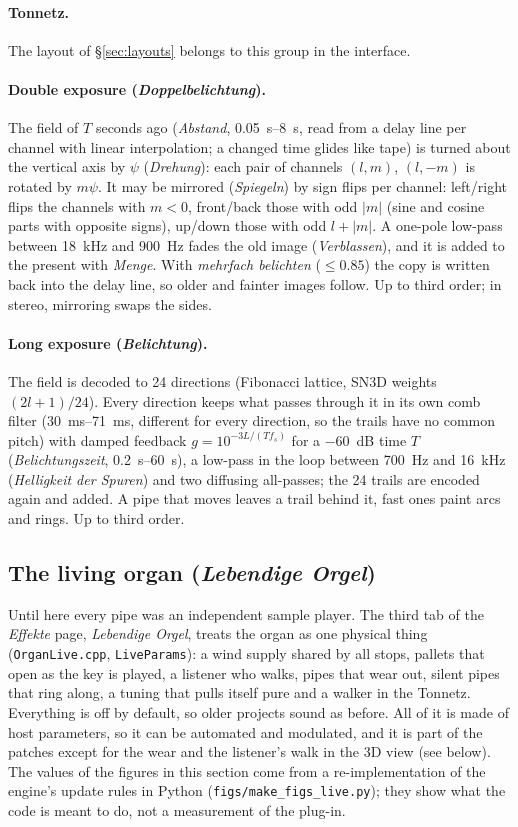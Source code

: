 \documentclass[11pt,a4paper,parskip=half,DIV=11,toc=bibliography]{scrartcl}
\newcommand{\ui}[1]{\emph{#1}}                 %
\newcommand{\fn}[1]{\mbox{\texttt{#1}}}
\begin{document}
\paragraph{Tonnetz.} The layout of \S\ref{sec:layouts} belongs to this group in the interface.

\paragraph{Double exposure (\ui{Doppelbelichtung}).} The field of $T$ seconds ago (\ui{Abstand}, \SIrange{0.05}{8}{s},
read from a delay line per channel with linear interpolation; a changed time glides like tape) is turned about the
vertical axis by $\psi$ (\ui{Drehung}): each pair of channels $(l,m)$, $(l,-m)$ is rotated by $m\psi$. It may be mirrored
(\ui{Spiegeln}) by sign flips per channel: left/right flips the channels with $m<0$, front/back those with odd $|m|$
(sine and cosine parts with opposite signs), up/down those with odd $l+|m|$. A one-pole low-pass between \SI{18}{kHz} and
\SI{900}{Hz} fades the old image (\ui{Verblassen}), and it is added to the present with \ui{Menge}. With \ui{mehrfach
belichten} ($\le0.85$) the copy is written back into the delay line, so older and fainter images follow. Up to third order;
in stereo, mirroring swaps the sides.

\paragraph{Long exposure (\ui{Belichtung}).} The field is decoded to 24 directions (Fibonacci lattice, SN3D weights
$(2l+1)/24$). Every direction keeps what passes through it in its own comb filter (\SIrange{30}{71}{ms}, different for
every direction, so the trails have no common pitch) with damped feedback $g=10^{-3L/(T f_s)}$ for a \SI{-60}{dB} time $T$
(\ui{Belichtungszeit}, \SIrange{0.2}{60}{s}), a low-pass in the loop between \SI{700}{Hz} and \SI{16}{kHz}
(\ui{Helligkeit der Spuren}) and two diffusing all-passes; the 24 trails are encoded again and added. A pipe that moves
leaves a trail behind it, fast ones paint arcs and rings. Up to third order.

\subsection{The living organ (\ui{Lebendige Orgel})}
\label{sec:live}
Until here every pipe was an independent sample player. The third tab of the \ui{Effekte} page, \ui{Lebendige Orgel},
treats the organ as one physical thing (\fn{OrganLive.cpp}, \fn{LiveParams}): a wind supply shared by all stops, pallets that
open as the key is played, a listener who walks, pipes that wear out, silent pipes that ring along, a tuning that pulls
itself pure and a walker in the Tonnetz. Everything is off by default, so older projects sound as before. All of it
is made of host parameters, so it can be automated and modulated, and it is part of the patches except for the wear
and the listener's walk in the 3D view (see below). The values of the figures in this section come from a re-implementation
of the engine's update rules in Python (\fn{figs/make\_figs\_live.py}); they show what the code is meant to do, not a
measurement of the plug-in.
\end{document}
